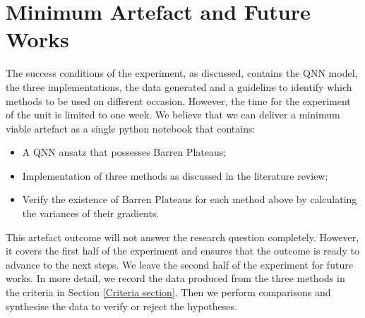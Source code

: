 \section{Minimum Artefact and Future Works}

The success conditions of the experiment, as discussed, contains the QNN model, the three implementations, the data generated and a guideline to identify which methods to be used on different occasion.
However, the time for the experiment of the unit is limited to one week. We believe that we can deliver a minimum viable artefact as a single python notebook that contains:
\begin{itemize}
    \item A QNN ansatz that possesses Barren Plateaus;
    \item Implementation of three methods as discussed in the literature review;
    \item Verify the existence of Barren Plateaus for each method above by calculating the variances of their gradients.
\end{itemize}

This artefact outcome will not answer the research question completely. 
However, it covers the first half of the experiment and ensures that the outcome is ready to advance to the next steps.
We leave the second half of the experiment for future works.
In more detail, we record the data produced from the three methods in the criteria in Section \ref{Criteria section}. 
Then we perform comparisons and synthesise the data to verify or reject the hypotheses.
